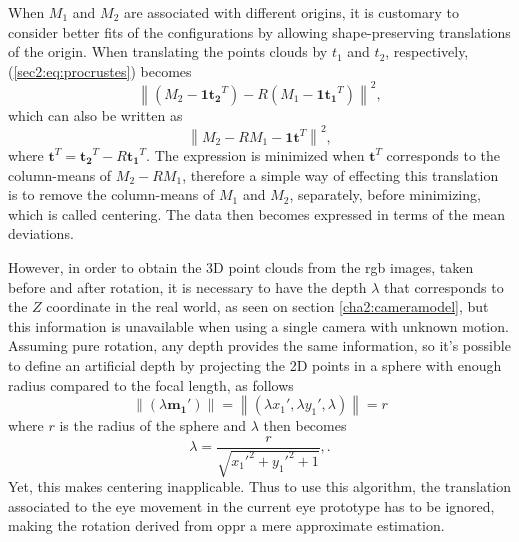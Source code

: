 When $M_1$ and $M_2$ are associated with different origins, it is customary to consider  better fits of the configurations by allowing shape-preserving translations of the origin.
When translating the points clouds by $t_1$ and $t_2$, respectively, (\ref{sec2:eq:procrustes}) becomes
\begin{equation}
\label{sec2:eq:strans1}
\left \|(M_2 - \mathbf{1} \mathbf{t_2}^T) - R(M_1 - \mathbf{1} \mathbf{t_1}^T)\right \|^2,
\end{equation}
which can also be written as
\begin{equation}
\label{sec2:eq:strans2}
\left \| M_2  - RM_1 - \mathbf{1} \mathbf{t}^T\right \|^2,
\end{equation}
where $\mathbf{t}^T = \mathbf{t_2}^T - R\mathbf{t_1}^T$. The expression is minimized when $\mathbf{t}^T$ corresponds to the column-means of $M_2 - RM_1$, therefore a simple way of effecting this translation is to remove the column-means of $M_1$ and $M_2$, separately, before minimizing, which is called centering. The data then becomes expressed in terms of the mean deviations. \cite{procrustes} 

However, in order to obtain the 3D point clouds from the \acrshort{rgb} images, taken before and after rotation, it is necessary to have the depth $\lambda$ that corresponds to the $Z$ coordinate in the real world, as seen on section \ref{cha2:cameramodel}, but this information is unavailable when using a single camera with unknown motion. Assuming pure rotation, any depth provides the same information, so it's possible to define an artificial depth by projecting the 2D points in a sphere with enough radius compared to the focal length, as follows
\begin{equation}
	\label{cha2:sec3:eq:spherepro}
	\left \| (\lambda \mathbf{m_1'})  \right \| = \left \| (\lambda x_1', \lambda y_1', \lambda)  \right \| = r
\end{equation}
where $r$ is the radius of the sphere and $\lambda$ then becomes
\begin{equation}
	\label{cha2:sec3:eq:lamdba}
	\lambda = \frac{r}{\sqrt{x_1'^2 + y_1'^2 + 1}},.
\end{equation}
Yet, this makes centering inapplicable. Thus to use this algorithm, the translation associated to the eye movement in the current eye prototype has to be ignored, making the rotation derived from \acrshort{oppr} a mere approximate estimation.
